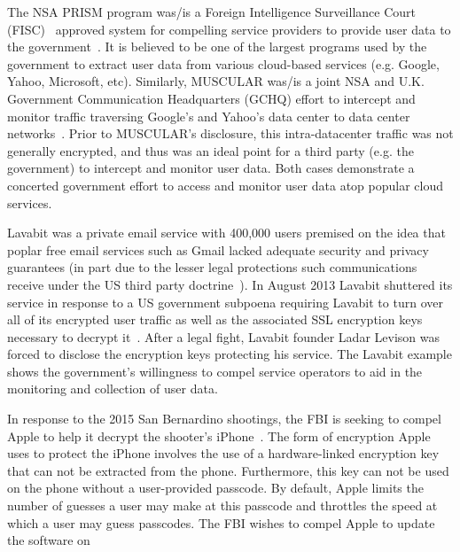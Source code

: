 \begin{packed_desc}
\item[PRISM and MUSCULAR:] The NSA PRISM program was/is a Foreign
  Intelligence Surveillance Court (FISC)~\cite{fisc} approved system
  for compelling service providers to provide user data to the
  government~\cite{greenwald-prism}. It is believed to be one of the
  largest programs used by the government to extract user data from
  various cloud-based services (e.g. Google, Yahoo, Microsoft,
  etc). Similarly, MUSCULAR was/is a joint NSA and U.K. Government
  Communication Headquarters (GCHQ) effort to intercept and monitor
  traffic traversing Google's and Yahoo's data center to data center
  networks~\cite{gellman-muscular}. Prior to MUSCULAR's disclosure,
  this intra-datacenter traffic was not generally encrypted, and thus
  was an ideal point for a third party (e.g. the government) to
  intercept and monitor user data. Both cases demonstrate a concerted
  government effort to access and monitor user data atop popular cloud
  services.
\item[Lavabit:] Lavabit was a private email service with 400,000 users
  premised on the idea that poplar free email services such as Gmail
  lacked adequate security and privacy guarantees (in part due to the
  lesser legal protections such communications receive under the US
  third party doctrine~\cite{thompson-thirdparty}). In August 2013
  Lavabit shuttered its service in response to a US government
  subpoena requiring Lavabit to turn over all of its encrypted user
  traffic as well as the associated SSL encryption keys necessary to
  decrypt it~\cite{lavabit, levsion-lavabit}. After a legal fight,
  Lavabit founder Ladar Levison was forced to disclose the encryption
  keys protecting his service. The Lavabit example shows the
  government's willingness to compel service operators to aid in the
  monitoring and collection of user data.
\item[Apple v. FBI:] In response to the 2015 San Bernardino shootings,
  the FBI is seeking to compel Apple to help it decrypt the shooter's
  iPhone~\cite{ars-cookvfbi}. The form of encryption Apple uses to
  protect the iPhone involves the use of a hardware-linked encryption
  key that can not be extracted from the phone. Furthermore, this key
  can not be used on the phone without a user-provided passcode. By
  default, Apple limits the number of guesses a user may make at this
  passcode and throttles the speed at which a user may guess
  passcodes. The FBI wishes to compel Apple to update the software on

\end{packed_desc}
